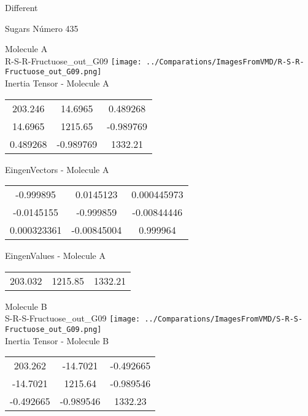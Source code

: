 \begin{center}
\vtab
\vtab
\textcolor{NavyBlue}{\Large Different}
\end{center}

 \newpage

\vtab[-2cm]
\begin{center}
{\large Sugars \tab Número 435}
\end{center}
\begin{multicols}{2}
\begin{center}

Molecule A \\ 
R-S-R-Fructuose\_out\_G09
\texttt{[image: ../Comparations/ImagesFromVMD/R-S-R-Fructuose\_out\_G09.png]}
\\
Inertia Tensor - Molecule A \\
\vtab

\begin{tabular}{|c c c|}
203.246	 & 	14.6965	 & 	0.489268	 \\
14.6965	 & 	1215.65	 & 	-0.989769	 \\
0.489268	 & 	-0.989769	 & 	1332.21
\end{tabular}

\vtab
 EingenVectors - Molecule A     \\
\vtab
\begin{tabular}{|c c c|}
-0.999895	 & 	0.0145123	 & 	0.000445973	 \\
-0.0145155	 & 	-0.999859	 & 	-0.00844446	 \\
0.000323361	 & 	-0.00845004	 & 	0.999964
\end{tabular}

\vtab
 EingenValues - Molecule A     \\
\vtab
\begin{tabular}{|c c c|}
203.032	 & 	1215.85	 & 	1332.21	 \\
\end{tabular}
\columnbreak

Molecule B \\ 
S-R-S-Fructuose\_out\_G09
\texttt{[image: ../Comparations/ImagesFromVMD/S-R-S-Fructuose\_out\_G09.png]}
\\
Inertia Tensor - Molecule B \\
\vtab

\begin{tabular}{|c c c|}
203.262	 & 	-14.7021	 & 	-0.492665	 \\
-14.7021	 & 	1215.64	 & 	-0.989546	 \\
-0.492665	 & 	-0.989546	 & 	1332.23
\end{tabular}


\end{center}
\end{multicols}
